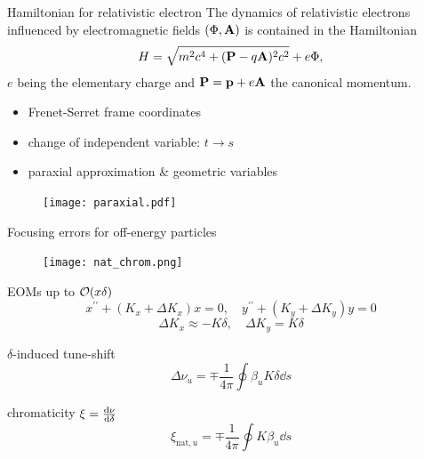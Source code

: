 \documentclass[aspectratio=169]{beamer}
\begin{document}
\begin{frame}{Hamiltonian for relativistic electron}
The dynamics of relativistic electrons influenced by electromagnetic fields $(\Phi, \vb{A})$ is contained in the Hamiltonian
    \begin{equation*}
        H=\sqrt{m^2c^4+(\vb{P}-q\vb{A})^2c^2}+e\Phi,
    \end{equation*}
 $e$ being the elementary charge and $\vb{P}=\vb{p}+e\vb{A}$ the canonical momentum.
\vfill
 \begin{minipage}{0.5\textwidth}
    \begin{itemize}
        \item Frenet-Serret frame coordinates
        \item change of independent variable: $t\to s$
        \item paraxial approximation \& geometric variables
     \end{itemize}
 \end{minipage}
 \hfill
\begin{minipage}{0.49\textwidth}
\begin{figure}
    \centering
    \texttt{[image: paraxial.pdf]}
\end{figure}
 \end{minipage}
\end{frame}
\begin{frame}{Focusing errors for off-energy particles}
    \begin{figure}
        \centering
        \texttt{[image: nat\_chrom.png]}
    \end{figure}{}
    \pause
    \begin{minipage}{\textwidth}
        EOMs up to $\order{x\delta}$
            \begin{equation*}
                x^{\prime\prime}+(K_x+\Delta K_x)x=0, \quad
                y^{\prime\prime}+(K_y+\Delta K_y)y=0
            \end{equation*}
            \begin{equation*}
                \Delta K_x  \approx - K\delta,\quad
                \Delta K_y =  K\delta
            \end{equation*}
            \pause
            \begin{minipage}{0.49\textwidth}
            $\delta$-induced tune-shift
            \begin{equation*}
                \Delta \nu _u = \mp \frac{1}{4\pi}\oint\beta_u K \delta \dd{s}
            \end{equation*}

        \end{minipage}
        \begin{minipage}{0.49\textwidth}

            chromaticity $\xi = \dv{\nu}{\delta}$
            \begin{equation*}
                \xi_{\text {nat}, u} =\mp \frac{1}{4 \pi} \oint K \beta_u \dd{s}
            \end{equation*}
        \end{minipage}
    \end{minipage}
    \vfill
\end{frame}{}
\end{document}
